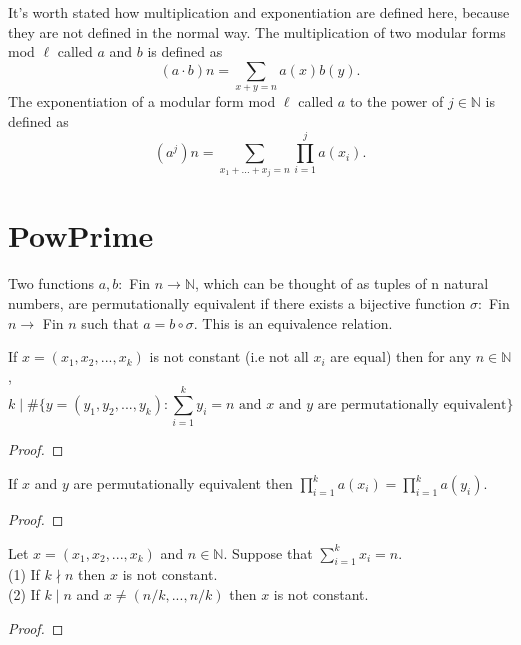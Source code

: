 \begin{definition} 
  \label{def:mulpow}
  \leanok
  It's worth stated how multiplication and exponentiation are defined here, because they are not defined in the normal way.
  The multiplication of two modular forms mod $\ell$ called $a$ and $b$ is defined as 
  \[(a \cdot b) n = \sum_{x + y = n} a(x) b(y).\] 
  The exponentiation of a modular form mod $\ell$ called $a$ to the power of $j \in \mathbb{N}$ is defined as 
  \[(a^j) n = \sum_ {x_1 + ... + x_j = n} \prod_{i = 1}^j a (x_i).\]
\end{definition}


\section{PowPrime}


\begin{definition} 
  \label{def:perm_equiv}
  \leanok
  Two functions $a, b : $ Fin $n \to \mathbb{N}$, which can be thought of as tuples of n natural numbers,
  are permutationally equivalent if there exists a bijective function $\sigma : $ Fin $n \to $ Fin $n$ such that 
  $a = b \circ \sigma$. This is an equivalence relation. 
\end{definition}

\begin{lemma}
  \label{lem:non_diag_vanish}
  \leanok
  If $x = (x_1, x_2, ..., x_k)$ is not constant (i.e not all $x_i$ are equal) then for any $n \in \mathbb{N}$,
  \[ k \mid \# \{y = (y_1, y_2, ..., y_k) : \sum_{i = 1}^k y_i = n \text{   and $x$ and $y$ are permutationally equivalent} \} \]
\end{lemma}
\begin{proof}
  \leanok
\end{proof}

\begin{lemma}
  \label{lem:Pi_eq_of_perm_equiv}
  \leanok
  If $x$ and $y$ are permutationally equivalent then $\prod_{i = 1}^k a(x_i) = \prod_{i = 1}^k a(y_i)$.
\end{lemma}
\begin{proof}
  \leanok
\end{proof}

\begin{lemma}
  \label{lem:non_const_of_tuple}
  \leanok
  Let $x = (x_1, x_2, ..., x_k)$ and $n \in \mathbb{N}$. Suppose that $\sum_{i = 1}^k x_i = n$. \\
  (1) If $k \nmid n$ then $x$ is not constant. \\
  (2) If $k \mid n$ and $x \neq (n/k, ..., n/k)$ then $x$ is not constant.
\end{lemma}
\begin{proof}
  \leanok
\end{proof}

